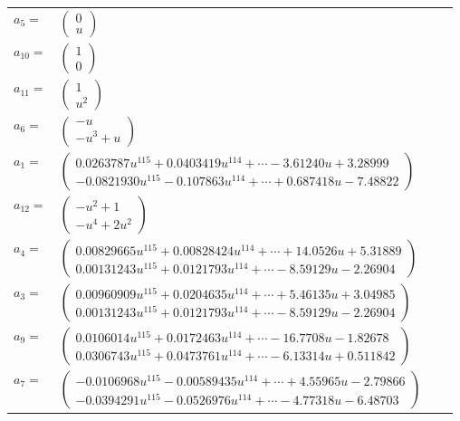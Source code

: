 \documentclass[1p]{elsarticle_modified}
\theoremstyle{definition}
\begin{document}
\begin{tabular}{m{7pt} m{180pt} m{7pt} m{180pt} }
\flushright $a_{5}=$&$\begin{pmatrix}0\\u\end{pmatrix}$ \\
\flushright $a_{10}=$&$\begin{pmatrix}1\\0\end{pmatrix}$ \\
\flushright $a_{11}=$&$\begin{pmatrix}1\\u^2\end{pmatrix}$ \\
\flushright $a_{6}=$&$\begin{pmatrix}- u\\- u^3+u\end{pmatrix}$ \\
\flushright $a_{1}=$&$\begin{pmatrix}0.0263787 u^{115}+0.0403419 u^{114}+\cdots-3.61240 u+3.28999\\-0.0821930 u^{115}-0.107863 u^{114}+\cdots+0.687418 u-7.48822\end{pmatrix}$ \\
\flushright $a_{12}=$&$\begin{pmatrix}- u^2+1\\- u^4+2 u^2\end{pmatrix}$ \\
\flushright $a_{4}=$&$\begin{pmatrix}0.00829665 u^{115}+0.00828424 u^{114}+\cdots+14.0526 u+5.31889\\0.00131243 u^{115}+0.0121793 u^{114}+\cdots-8.59129 u-2.26904\end{pmatrix}$ \\
\flushright $a_{3}=$&$\begin{pmatrix}0.00960909 u^{115}+0.0204635 u^{114}+\cdots+5.46135 u+3.04985\\0.00131243 u^{115}+0.0121793 u^{114}+\cdots-8.59129 u-2.26904\end{pmatrix}$ \\
\flushright $a_{9}=$&$\begin{pmatrix}0.0106014 u^{115}+0.0172463 u^{114}+\cdots-16.7708 u-1.82678\\0.0306743 u^{115}+0.0473761 u^{114}+\cdots-6.13314 u+0.511842\end{pmatrix}$ \\
\flushright $a_{7}=$&$\begin{pmatrix}-0.0106968 u^{115}-0.00589435 u^{114}+\cdots+4.55965 u-2.79866\\-0.0394291 u^{115}-0.0526976 u^{114}+\cdots-4.77318 u-6.48703\end{pmatrix}$ \\

\end{tabular}
\end{document}
